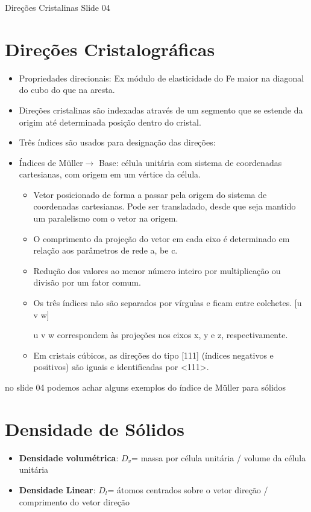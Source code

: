 

{\large Direções Cristalinas Slide 04}

\section{Direções Cristalográficas}

\begin{itemize}
	\item Propriedades direcionais: Ex módulo de elasticidade do Fe maior na diagonal do cubo do que na aresta.
	\item Direções cristalinas são indexadas através de um segmento que se estende da origim até determinada posição dentro do cristal.
	\item Três índices são usados para designação das direções:

\end{itemize}


\begin{itemize}
	\item Índices de Müller$\rightarrow$ Base: célula unitária com sistema de coordenadas cartesianas, com origem em um vértice da célula.
	\begin{itemize}
		\item Vetor posicionado de forma a passar pela origem do sistema de coordenadas cartesianas. Pode ser transladado, desde que seja mantido um paralelismo com o vetor na origem.
		\item O comprimento da projeção do vetor em cada eixo é determinado em relação aos parâmetros de rede a, be c.
		\item Redução dos valores ao menor número inteiro por multiplicação ou divisão por um fator comum.
		\item Os três índices não são separados por vírgulas e ficam entre colchetes. [u v w]
		\item [u v w] correspondem às projeções nos eixos x, y e z, respectivamente.
	 	\item Em cristais cúbicos, as direções do tipo [111] (índices negativos e positivos) são iguais e identificadas por <111>.
	\end{itemize}	
\end{itemize}

{\large no slide 04 podemos achar alguns exemplos do índice de Müller para sólidos}


\section{Densidade de Sólidos}





\begin{itemize}
	\item \textbf{Densidade volumétrica}: $D_{v}$= massa por célula unitária / volume da célula unitária
	\item \textbf{Densidade Linear}: $D_{l}$= átomos centrados sobre o vetor direção / comprimento do vetor direção
\end{itemize}

